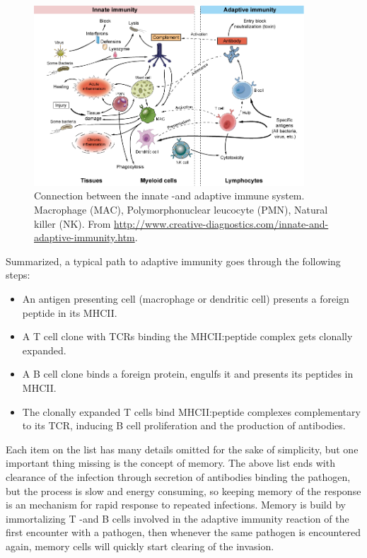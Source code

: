 \begin{figure}
    \centering
    \includegraphics[width=0.9\textwidth]{figures/innate_and_adaptive.png}
    \caption{
        \label{fig:innate_and_adaptive}
        Connection between the innate -and adaptive immune system.
        Macrophage (MAC), Polymorphonuclear leucocyte (PMN), Natural killer (NK).
        From \url{http://www.creative-diagnostics.com/innate-and-adaptive-immunity.htm}.
    }
\end{figure}


Summarized, a typical path to adaptive immunity goes through the following steps:
\begin{itemize}
  \item An antigen presenting cell (macrophage or dendritic cell) presents a foreign peptide in its MHCII.
  \item A T cell clone with TCRs binding the MHCII:peptide complex gets clonally expanded.
  \item A B cell clone binds a foreign protein, engulfs it and presents its peptides in MHCII.
  \item The clonally expanded T cells bind MHCII:peptide complexes complementary to its TCR, inducing B cell proliferation and the production of antibodies.
\end{itemize}
Each item on the list has many details omitted for the sake of simplicity, but one important thing missing is the concept of memory.
The above list ends with clearance of the infection through secretion of antibodies binding the pathogen, but the process is slow and energy consuming, so keeping memory of the response is an mechanism for rapid response to repeated infections.
Memory is build by immortalizing T -and B cells involved in the adaptive immunity reaction of the first encounter with a pathogen, then whenever the same pathogen is encountered again, memory cells will quickly start clearing of the invasion.







